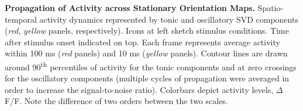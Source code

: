 \textbf{Propagation of Activity across Stationary Orientation Maps.}
Spatio-temporal activity dynamics represented by tonic and oscillatory SVD
components (\textit{red}, \textit{yellow} panels, respectively). Icons at left sketch
stimulus conditions. Time after stimulus onset indicated on top. Each frame
represents average activity within 100 ms (\textit{red} panels) and 10 ms
(\textit{yellow} panels). Contour lines are drawn around
90\textsuperscript{th} percentiles of activity for the tonic components and
at zero crossings for the oscillatory components (multiple cycles of
propagation were averaged in order to increase the signal-to-noise ratio).
Colorbars depict activity levels, $\Delta$F/F. Note the difference of two
orders between the two scales.
